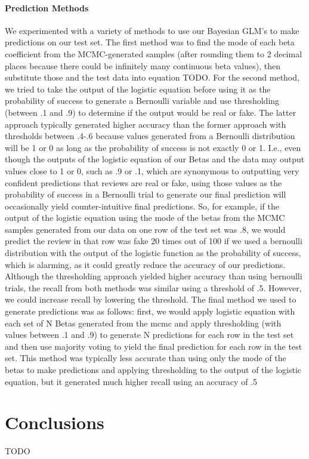 \documentclass[man, floatsintext, 10pt]{apa6}
\begin{document}
\vspace{2mm}

\paragraph{Prediction Methods} We experimented with a variety of methods to use our Bayesian GLM's to make predictions on our test set. The first method was to find the mode of each beta coefficient from the MCMC-generated samples (after rounding them to 2 decimal places because there could be infinitely many continuous beta values), then substitute those and the test data into equation TODO. For the second method, we tried to take the output of the logistic equation before using it as the probability of success to generate a Bernoulli variable and use thresholding (between .1 and .9) to determine if the output would be real or fake. The latter approach typically generated higher accuracy than the former approach with thresholds between .4-.6 because values generated from a Bernoulli distribution will be 1 or 0 as long as the probability of success is not exactly 0 or 1. I.e., even though the outputs of the logistic equation of our Betas and the data may output values close to 1 or 0, such as .9 or .1, which are synonymous to outputting very confident predictions that reviews are real or fake, using those values as the probability of success in a Bernoulli trial to generate our final prediction will occasionally yield counter-intuitive final predictions. So, for example, if the output of the logistic equation using the mode of the betas from the MCMC samples generated from our data on one row of the test set was .8, we would predict the review in that row was fake 20 times out of 100 if we used a bernoulli distribution with the output of the logistic function as the probability of success, which is alarming, as it could greatly reduce the accuracy of our predictions. Although the thresholding approach yielded higher accuracy than using bernoulli trials, the recall from both methods was similar using a threshold of .5. However, we could increase recall by lowering the threshold. The final method we used to generate predictions was as follows: first, we would apply logistic equation with each set of N Betas generated from the mcmc and apply thresholding (with values between .1 and .9) to generate N predictions for each row in the test set and then use majority voting to yield the final prediction for each row in the test set. This method was typically less accurate than using only the mode of the betas to make predictions and applying thresholding to the output of the logistic equation, but it generated much higher recall using an accuracy of .5

\section{Conclusions} 

TODO
\end{document}
